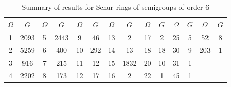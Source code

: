 \documentclass{article}
\theoremstyle{plain}
\theoremstyle{definition}
\newcommand{\LO}{\mathrm{LO}}
\newcommand{\RO}{\mathrm{RO}}
\newcommand{\ORO}{\mathrm{ORO}}
\newcommand{\OLO}{\mathrm{OLO}}
\newcommand{\CH}{\mathrm{CH}}
\newcommand{\z}{\mathrm{Z}}
\renewcommand{\u}{\ \mathfrak{u}\ }
\begin{document}

\begin{table}[!ht]
\begin{center}
\begin{tabular}{cc|cc|cc|cc|cc|cc|cc}
$\Omega$   & $G$ & $\Omega$   & $G$ & $\Omega$  & $G$ & $\Omega$   & $G$ & $\Omega$ & $G$ & $\Omega$ & $G$ & $\Omega$ & $G$\\
\hline
1  &2093 &  5  &2443 &  9  &46  &  13 &2    &  17 &2  &  25 &5  &  52 & 8 \\
2  &5259 &  6  &400  &  10 &292 &  14 &13   &  18 &18 &  30 &9  &  203 & 1 \\
3  &916  &  7  &215  &  11 &12  &  15 &1832 &  20 &10 &  31  & 1  \\
4  &2202 &  8  &173  &  12 &17  &  16 &2   &  22 &1  &  45  & 1  \\
\end{tabular}
\caption{Summary of results for Schur rings of semigroups of order $6$}
\label{fig:sr6}
\end{center}
\end{table}
\end{document}
